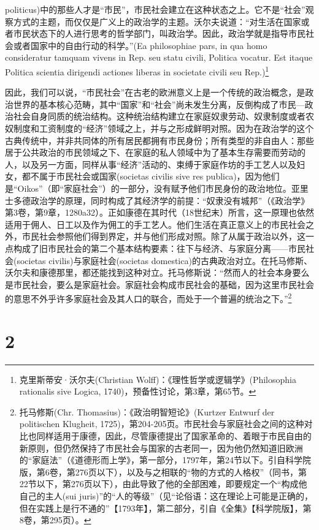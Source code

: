 politicus)中的那些人才是“市民”，市民社会建立在这种状态之上。它不是“社会”观察方式的主题，而仅仅是广义上的政治学的主题。沃尔夫说道：“对生活在国家或者市民状态下的人进行思考的哲学部门，叫政治学。因此，政治学就是指导市民社会或者国家中的自由行动的科学。”(Ea philosophiae pars, in qua homo consideratur tamquam vivens in Rep. seu statu civili, Politica vocatur. Est itaque Politica scientia dirigendi actiones liberas in societate civili seu Rep.)\footnote{克里斯蒂安·沃尔夫(Christian Wolff)：《理性哲学或逻辑学》(Philosophia rationalis sive Logica, 1740)，预备性讨论，第3章，第65节。}

因此，我们可以说，“市民社会”在古老的欧洲意义上是一个传统的政治概念，是政治世界的基本核心范畴，其中“国家”和“社会”尚未发生分离，反倒构成了市民—政治社会自身同质的统治结构。这种统治结构建立在家庭奴隶劳动、奴隶制度或者农奴制度和工资制度的“经济”领域之上，并与之形成鲜明对照。因为在政治学的这个古典传统中，并非共同体的所有居民都拥有市民身份；所有类型的非自由人：那些居于公共政治的市民领域之下、在家庭的私人领域中为了基本生存需要而劳动的人，以及另一方面，同样从事“经济”活动的、束缚于家庭作坊的手工艺人以及妇女，都不属于市民社会或国家(societas civilis sive res publica)，因为他们是“Oikos”（即“家庭社会”）的一部分，没有赋予他们市民身份的政治地位。亚里士多德政治学的原理，同时构成了其经济学的前提：“奴隶没有城邦”（《政治学》第3卷，第9章，1280a32）。正如康德在其时代（18世纪末）所言，这一原理也依然适用于佣人、日工以及作为佣工的手工艺人。他们生活在真正意义上的市民社会之外，市民社会参照他们得到界定，并与他们形成对照。除了从属于政治以外，这一点构成了旧市民社会的第二个基本结构要素：往下与经济、与家庭分离——市民社会(societas civilis)与家庭社会(societas domestica)的古典政治对立。在托马修斯、沃尔夫和康德那里，都还能找到这种对立。托马修斯说：“然而人的社会本身要么是市民社会，要么是家庭社会。家庭社会构成市民社会的基础，因为这里市民社会的意思不外乎许多家庭社会及其人口的联合，而处于一个普遍的统治之下。”\footnote{托马修斯(Chr. Thomasius)：《政治明智短论》(Kurtzer Entwurf der politischen Klugheit, 1725)，第204-205页。市民社会与家庭社会之间的这种对比也同样适用于康德，因此，尽管康德提出了国家革命的、着眼于市民自由的新原则，但仍然保持了市民社会与国家的古老同一，因为他仍然知道旧欧洲的“家庭法”（《道德形而上学》，第一部分，1797年，第24节以下。引自科学院版，第6卷，第276页以下），以及与之相联的“物的方式的人格权”（同书，第22节以下，第276页以下），由此导致了他的全部困难，即要规定一个“构成他自己的主人(sui juris)”的“人的等级”（见“论俗语：这在理论上可能是正确的，但在实践上是行不通的”【1793年】，第二部分，引自《全集》【科学院版】，第8卷，第295页）。}

\section*{2}


